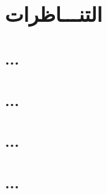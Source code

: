 \chapter{ التنـــاظرات}

\label{Chapter4}


\section{...}

\section{...}

\section{...}

\section{...}

